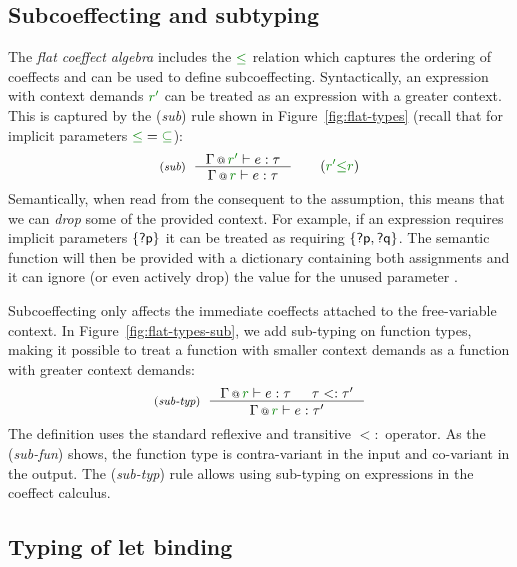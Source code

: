 
\subsection{Subcoeffecting and subtyping}
\label{sec:flat-exts-sub}

The \emph{flat coeffect algebra} includes the $\cleq$ relation which captures the ordering of
coeffects and can be used to define subcoeffecting. Syntactically, an expression with context
demands $\cclrd{r'}$ can be treated as an expression with a greater context. This is captured
by the (\emph{sub}) rule shown in Figure~\ref{fig:flat-types} (recall that for implicit
parameters $\cleq = \cclrd{\subseteq}$):
%
\begin{equation*}
\tyrule{sub}
  {\coctx{\Gamma}{\cclrd{r'}} \vdash e : \tau }
  {\coctx{\Gamma}{\cclrd{r}} \vdash e : \tau }\quad\quad(\cclrd{r'} \cleq \cclrd{r})
\end{equation*}
%
Semantically, when read from the consequent to the assumption, this means that we can \emph{drop}
some of the provided context. For example, if an expression requires implicit parameters
$\{ \textnormal{\sffamily ?p} \}$ it can be treated as requiring $\{ \textnormal{\sffamily ?p}, \textnormal{\sffamily ?q} \}$. The semantic
function will then be provided with a dictionary containing both assignments and it can ignore
(or even actively drop) the value for the unused parameter .

Subcoeffecting only affects the immediate coeffects attached to the free-variable context.
In Figure~\ref{fig:flat-types-sub}, we add sub-typing on function types, making it possible to treat
a function with smaller context demands as a function with greater context demands:
%
\begin{equation*}
\tyrule{sub-typ}
  { \coctx{\Gamma}{\cclrd{r}} \vdash e : \tau & \tau <: \tau' }
  { \coctx{\Gamma}{\cclrd{r}} \vdash e : \tau' }
\end{equation*}
%
The definition uses the standard reflexive and transitive $<:$ operator. As the (\emph{sub-fun})
shows, the function type is contra-variant in the input and co-variant in the output. The
(\emph{sub-typ}) rule allows using sub-typing on expressions in the coeffect calculus.


\subsection{Typing of let binding}
\label{sec:flat-exts-let}


